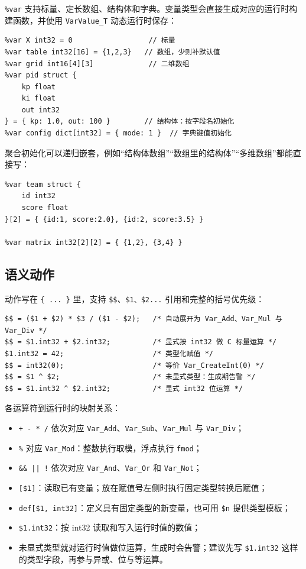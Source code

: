 \texttt{\%var} 支持标量、定长数组、结构体和字典。变量类型会直接生成对应的运行时构建函数，并使用 \texttt{VarValue\_T} 动态运行时保存：

\begin{lstlisting}
%var X int32 = 0                  // 标量
%var table int32[16] = {1,2,3}   // 数组，少则补默认值
%var grid int16[4][3]             // 二维数组
%var pid struct {
    kp float
    ki float
    out int32
} = { kp: 1.0, out: 100 }        // 结构体：按字段名初始化
%var config dict[int32] = { mode: 1 }  // 字典键值初始化
\end{lstlisting}

聚合初始化可以递归嵌套，例如“结构体数组”“数组里的结构体”“多维数组”都能直接写：

\begin{lstlisting}
%var team struct {
    id int32
    score float
}[2] = { {id:1, score:2.0}, {id:2, score:3.5} }

%var matrix int32[2][2] = { {1,2}, {3,4} }
\end{lstlisting}

\subsection{语义动作}

动作写在 \texttt{\{ ... \}} 里，支持 \texttt{\$\$}、\texttt{\$1、\$2...} 引用和完整的括号优先级：

\begin{lstlisting}
$$ = ($1 + $2) * $3 / ($1 - $2);   /* 自动展开为 Var_Add、Var_Mul 与 Var_Div */
$$ = $1.int32 + $2.int32;          /* 显式按 int32 做 C 标量运算 */
$1.int32 = 42;                     /* 类型化赋值 */
$$ = int32(0);                     /* 等价 Var_CreateInt(0) */
$$ = $1 ^ $2;                      /* 未显式类型：生成期告警 */
$$ = $1.int32 ^ $2.int32;          /* 显式 int32 位运算 */
\end{lstlisting}

各运算符到运行时的映射关系：

\begin{itemize}
\item \texttt{+ - * /} 依次对应 \texttt{Var\_Add}、\texttt{Var\_Sub}、\texttt{Var\_Mul} 与 \texttt{Var\_Div}；
\item \texttt{\%} 对应 \texttt{Var\_Mod}：整数执行取模，浮点执行 \texttt{fmod}；
\item \texttt{\&\& || !} 依次对应 \texttt{Var\_And}、\texttt{Var\_Or} 和 \texttt{Var\_Not}；
\item \texttt{[\$1]}：读取已有变量；放在赋值号左侧时执行固定类型转换后赋值；
\item \texttt{def[\$1, int32]}：定义具有固定类型的新变量，也可用 \texttt{\$n} 提供类型模板；
\item \texttt{\$1.int32}：按 int32 读取和写入运行时值的数值；
\item 未显式类型就对运行时值做位运算，生成时会告警；建议先写 \texttt{\$1.int32} 这样的类型字段，再参与异或、位与等运算。
\end{itemize}


